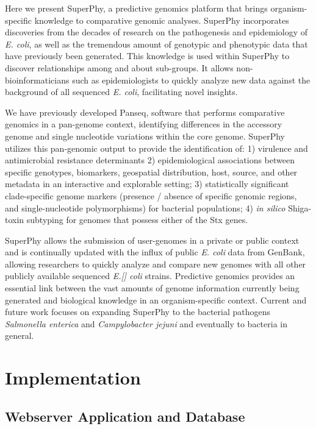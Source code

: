 \documentclass[doublespacing, linenumbers]{bmcart}
\begin{document}
Here we present SuperPhy, a predictive genomics platform that brings organism-specific knowledge to comparative genomic analyses. SuperPhy incorporates discoveries from the decades of research on the pathogenesis and epidemiology of \textit{E. coli}, as well as the tremendous amount of genotypic and phenotypic data that have previously been generated. This knowledge is used within SuperPhy to discover relationships among and about sub-groups. It allows non-bioinformaticians such as epidemiologists to quickly analyze new data against the background of all sequenced \textit{E. coli}, facilitating novel insights.

We have previously developed Panseq, software that performs comparative genomics in a  pan-genome context,  identifying differences in the accessory genome and single nucleotide variations within the core genome\cite{laing_pan-genome_2010}. SuperPhy utilizes this pan-genomic output to provide the identification of: 1) virulence and antimicrobial resistance determinants 2) epidemiological associations between specific genotypes, biomarkers, geospatial distribution, host, source, and other metadata in an interactive and explorable setting; 3) statistically significant clade-specific genome markers (presence / absence of specific genomic regions, and single-nucleotide polymorphisms) for bacterial populations; 4) \textit{in silico} Shiga-toxin subtyping for genomes that possess either of the Stx genes.

SuperPhy allows the submission of user-genomes in a private or public context and is continually updated with the influx of public \textit{E. coli} data from GenBank, allowing researchers to quickly analyze and compare new genomes with all other publicly available sequenced \textit{E.[] coli} strains. Predictive genomics provides an essential link between the vast amounts of genome information currently being generated and biological knowledge in an organism-specific context. Current and future work focuses on expanding SuperPhy to the bacterial pathogens \textit{Salmonella enterica} and \textit{Campylobacter jejuni} and eventually to bacteria in general.

\section{Implementation}
\subsection{Webserver Application and Database}
\end{document}
